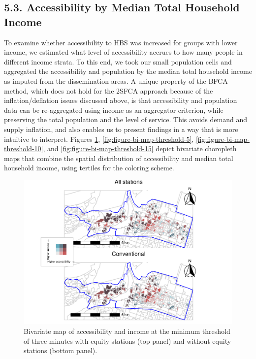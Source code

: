 \documentclass[]{elsarticle} %
\begin{document}
\hypertarget{accessibility-by-median-total-household-income}{%
\subsection{5.3. Accessibility by Median Total Household
Income}\label{accessibility-by-median-total-household-income}}

To examine whether accessibility to HBS was increased for groups with
lower income, we estimated what level of accessibility accrues to how
many people in different income strata. To this end, we took our small
population cells and aggregated the accessibility and population by the
median total household income as imputed from the dissemination areas. A
unique property of the BFCA method, which does not hold for the 2SFCA
approach because of the inflation/deflation issues discussed above, is
that accessibility and population data can be re-aggregated using income
as an aggregator criterion, while preserving the total population and
the level of service. This avoids demand and supply inflation, and also
enables us to present findings in a way that is more intuitive to
interpret. Figures \ref{fig:figure-bi-map-threshold-3},
\ref{fig:figure-bi-map-threshold-5},
\ref{fig:figure-bi-map-threshold-10}, and
\ref{fig:figure-bi-map-threshold-15} depict bivariate choropleth maps
that combine the spatial distribution of accessibility and median total
household income, using tertiles for the coloring scheme.

\begin{figure}
\includegraphics[width=1.2\linewidth]{Bike-share-spatial-equity_files/figure-latex/figure-bi-map-threshold-3-1} \caption{\label{fig-bivariate-map-threshold-3}Bivariate map of accessibility and income at the minimum threshold of three minutes with equity stations (top panel) and without equity stations (bottom panel).}\label{fig:figure-bi-map-threshold-3}
\end{figure}
\end{document}
